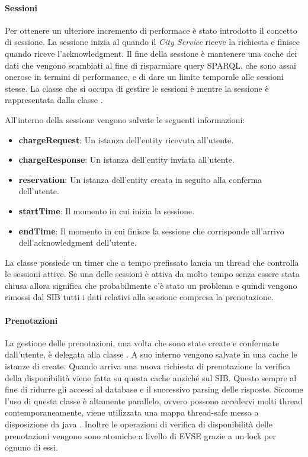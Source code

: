 \paragraph{Sessioni}

Per ottenere un ulteriore incremento di performace è stato introdotto il concetto di sessione. La sessione inizia al quando il \emph{City Service} riceve la richiesta e finisce quando riceve l'acknowledgment. Il fine della sessione è mantenere una cache dei dati che vengono scambiati al fine di risparmiare query SPARQL, che sono assai onerose in termini di performance, e di dare un limite temporale alle sessioni stesse. La classe che si occupa di gestire le sessioni è  mentre la sessione è rappresentata dalla classe .

All'interno della sessione vengono salvate le seguenti informazioni:

\begin{itemize}
	\item \textbf{chargeRequest}: Un istanza dell'entity  ricevuta all'utente. 
	\item \textbf{chargeResponse}: Un istanza dell'entity  inviata all'utente. 
	\item \textbf{reservation}: Un istanza dell'entity  creata in seguito alla conferma dell'utente.
	\item \textbf{startTime}: Il momento in cui inizia la sessione.
	\item \textbf{endTime}: Il momento in cui finisce la sessione che corrisponde all'arrivo dell'acknowledgment dell'utente.
\end{itemize}

\noindent
La classe  possiede un timer che a tempo prefissato lancia un thread che controlla le sessioni attive. Se una delle sessioni è attiva da molto tempo senza essere stata chiusa allora significa che probabilmente c'è stato un problema e quindi vengono rimossi dal SIB tutti i dati relativi alla sessione compresa la prenotazione.

\paragraph{Prenotazioni}

La gestione delle prenotazioni, una volta che sono state create e confermate dall'utente, è delegata alla classe . A suo interno vengono salvate in una cache le istanze di  create. Quando arriva una nuova richiesta di prenotazione la verifica della disponibilità viene fatta su questa cache anziché sul SIB. Questo sempre al fine di ridurre gli accessi al database e il successivo parsing delle risposte.
Siccome l'uso di questa classe è altamente parallelo, ovvero possono accedervi molti thread contemporaneamente, viene utilizzata una mappa thread-safe messa a disposizione da java . Inoltre le operazioni di verifica di disponibilità delle prenotazioni vengono sono atomiche a livello di EVSE grazie a un lock per ognuno di essi. 

